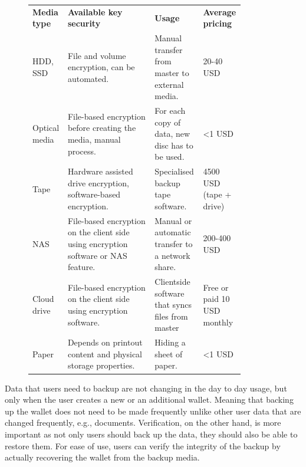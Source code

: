 \documentclass[
  printed, %
  table,   %
  lof,     %
  lot,     %
           oneside, color
]{fithesis3}
\begin{document}
\begin{figure}[H]
\centering
\begin{tabular}{p{0.1\linewidth}p{0.4\linewidth}p{0.20\linewidth}p{0.15\linewidth}}
\textbf{Media type} & \textbf{Available key security}                                    & \textbf{Usage}                                   & \textbf{Average pricing}      \\
HDD, SSD            & File and volume encryption, can be automated.                       & Manual transfer from master to external media.    & 20-40 USD                              \\
Optical media       & File-based encryption before creating the media, manual process.            & For each copy of data, new disc has to be used.   & \textless{}1 USD                       \\
Tape                & Hardware assisted drive encryption, software-based encryption.       & Specialised backup tape software.                & 4500 USD (tape + drive) \\
NAS                 & File-based encryption on the client side using encryption software or NAS feature. & Manual or automatic transfer to a network share.    & 200-400 USD                            \\
Cloud drive       & File-based encryption on the client side using encryption software. & Clientside software that syncs files from master & Free or paid 10 USD monthly                      \\
Paper               & Depends on printout content and physical storage properties.        & Hiding a sheet of paper.                          & \textless{}1 USD                       \\

\end{tabular}


\label{table:secure-storage}
\end{figure}

Data that users need to backup are not changing in the day to day usage, but only when the user creates a new or an additional wallet. Meaning that backing up the wallet does not need to be made frequently unlike other user data that are changed frequently, e.g., documents. Verification, on the other hand, is more important as not only users should back up the data, they should also be able to restore them. For ease of use, users can verify the integrity of the backup by actually recovering the wallet from the backup media.
\end{document}
